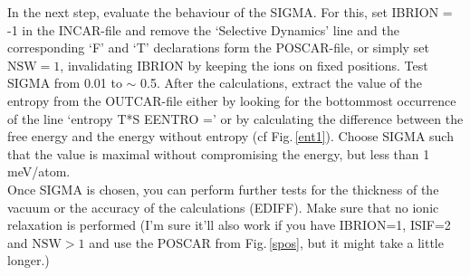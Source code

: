 \documentclass[twoside, 11pt, titlepage, captions=nooneline, a4paper, headsepline]{scrbook}%
\begin{document}
In the next step, evaluate the behaviour of the SIGMA. For this, set IBRION = -1 in the INCAR-file and remove the `Selective Dynamics' line and the corresponding `F' and `T' declarations form the POSCAR-file, or simply set $ \mathrm{NSW} = 1 $, invalidating IBRION by keeping the ions on fixed positions. Test SIGMA from 0.01 to $\sim$ 0.5. After the calculations, extract the value of the entropy from the OUTCAR-file either by looking for the bottommost occurrence of the line `entropy T*S    EENTRO =' or by calculating the difference between the free energy and the energy without entropy (cf Fig.\,\ref{ent1}). Choose SIGMA such that the value is maximal without compromising the energy, but less than 1\,meV/atom.\\
Once SIGMA is chosen, you can perform further tests for the thickness of the vacuum or the accuracy of the calculations (EDIFF). Make sure that no ionic relaxation is performed (I'm sure it'll also work if you have IBRION=1, ISIF=2 and $ \mathrm{NSW} > 1 $ and use the POSCAR from Fig.\,\ref{spos}, but it might take a little longer.)
\end{document}
